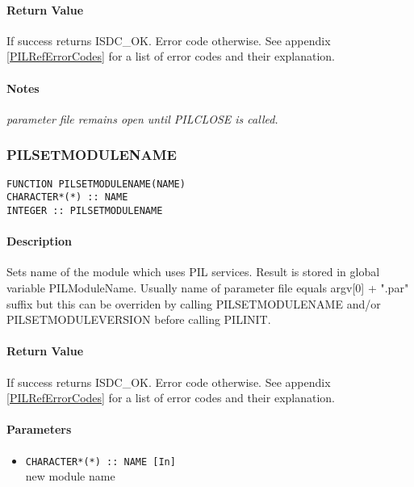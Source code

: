 \paragraph{Return Value\\}
If success returns ISDC\_OK. Error code otherwise. See appendix \ref{PILRefErrorCodes}
for a list of error codes and their explanation.

\paragraph{Notes\\}
{\it
parameter file remains open until PILCLOSE is called. 
}


\subsubsection{PILSETMODULENAME}

\begin{verbatim}
FUNCTION PILSETMODULENAME(NAME) 
CHARACTER*(*) :: NAME 
INTEGER :: PILSETMODULENAME 
\end{verbatim}

\paragraph{Description\\}
Sets name of the module which uses PIL services. Result is stored in global
variable PILModuleName. Usually
name of parameter file equals argv[0] + ".par" suffix but this can be
overriden by calling PILSETMODULENAME
and/or PILSETMODULEVERSION before calling PILINIT. 

\paragraph{Return Value\\}
If success returns ISDC\_OK. Error code otherwise. See appendix \ref{PILRefErrorCodes}
for a list of error codes and their explanation.

\paragraph{Parameters}
\begin{itemize}
\item
{\tt CHARACTER*(*) :: NAME [In] } \\
new module name
\end{itemize}



